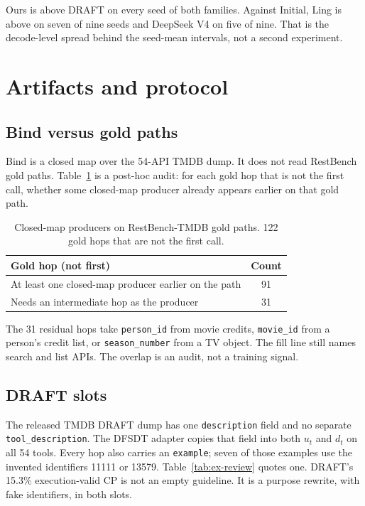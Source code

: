 \documentclass[11pt,a4paper]{article}
\begin{document}
Ours is above DRAFT on every seed of both families. Against Initial, Ling is above on seven of nine seeds and DeepSeek V4 on five of nine. That is the decode-level spread behind the seed-mean intervals, not a second experiment.

\section{Artifacts and protocol}
\label{app:artifacts}

\subsection{Bind versus gold paths}
\label{app:bind}

Bind is a closed map over the 54-API TMDB dump. It does not read RestBench gold paths. Table~\ref{tab:bind-gold} is a post-hoc audit: for each gold hop that is not the first call, whether some closed-map producer already appears earlier on that gold path.

\begin{table}[H]
\centering
\caption{Closed-map producers on RestBench-TMDB gold paths. 122 gold hops that are not the first call.}
\label{tab:bind-gold}
\small
\begin{tabular}{lc}
\toprule
Gold hop (not first) & Count \\
\midrule
At least one closed-map producer earlier on the path & 91 \\
Needs an intermediate hop as the producer & 31 \\
\bottomrule
\end{tabular}
\end{table}

The 31 residual hops take \texttt{person\_id} from movie credits, \texttt{movie\_id} from a person's credit list, or \texttt{season\_number} from a TV object. The fill line still names search and list APIs. The overlap is an audit, not a training signal.

\subsection{DRAFT slots}
\label{app:draft-slots}

The released TMDB DRAFT dump has one \texttt{description} field and no separate \texttt{tool\_description}. The DFSDT adapter copies that field into both $u_t$ and $d_t$ on all 54 tools. Every hop also carries an \texttt{example}; seven of those examples use the invented identifiers 11111 or 13579. Table~\ref{tab:ex-review} quotes one. DRAFT's 15.3\% execution-valid CP is not an empty guideline. It is a purpose rewrite, with fake identifiers, in both slots.
\end{document}
